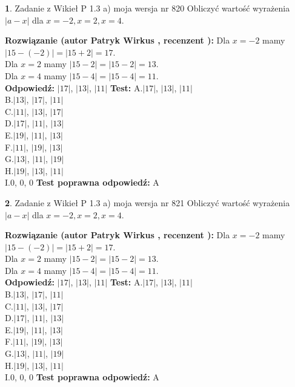 \documentclass[12pt, a4paper]{article}
\theoremstyle{definition} %
\newtheorem{zad}{}
\newcommand{\zadStart}[1]{\begin{zad}#1\newline}
\newcommand{\zadStop}{\end{zad}}
\newcommand{\rozwStart}[2]{\noindent \textbf{Rozwiązanie (autor #1 , recenzent #2): }\newline}
\newcommand{\rozwStop}{\newline}
\newcommand{\odpStart}{\noindent \textbf{Odpowiedź:}\newline}
\newcommand{\odpStop}{\newline}
\newcommand{\testStart}{\noindent \textbf{Test:}\newline}
\newcommand{\testStop}{\newline}
\newcommand{\kluczStart}{\noindent \textbf{Test poprawna odpowiedź:}\newline}
\newcommand{\kluczStop}{\newline}
\begin{document}
\zadStart{Zadanie z Wikieł P 1.3 a) moja wersja nr 820}
Obliczyć wartość wyrażenia $|a - x|$ dla $x=-2,x=2,x=4$.
\zadStop
\rozwStart{Patryk Wirkus}{}
Dla $x = -2$ mamy $|15 - (-2)| = |15 + 2| = 17$.\\
Dla $x = 2$ mamy $|15 - 2| = |15 - 2| = 13$.\\
Dla $x = 4$ mamy $|15 - 4| = |15 - 4| = 11$.\\
\rozwStop
\odpStart
$|17|$, $|13|$, $|11|$
\odpStop
\testStart
A.$|17|$, $|13|$, $|11|$\\
B.$|13|$, $|17|$, $|11|$\\
C.$|11|$, $|13|$, $|17|$\\
D.$|17|$, $|11|$, $|13|$\\
E.$|19|$, $|11|$, $|13|$\\
F.$|11|$, $|19|$, $|13|$\\
G.$|13|$, $|11|$, $|19|$\\
H.$|19|$, $|13|$, $|11|$\\
I.$0$, $0$, $0$
\testStop
\kluczStart
A
\kluczStop



\zadStart{Zadanie z Wikieł P 1.3 a) moja wersja nr 821}
Obliczyć wartość wyrażenia $|a - x|$ dla $x=-2,x=2,x=4$.
\zadStop
\rozwStart{Patryk Wirkus}{}
Dla $x = -2$ mamy $|15 - (-2)| = |15 + 2| = 17$.\\
Dla $x = 2$ mamy $|15 - 2| = |15 - 2| = 13$.\\
Dla $x = 4$ mamy $|15 - 4| = |15 - 4| = 11$.\\
\rozwStop
\odpStart
$|17|$, $|13|$, $|11|$
\odpStop
\testStart
A.$|17|$, $|13|$, $|11|$\\
B.$|13|$, $|17|$, $|11|$\\
C.$|11|$, $|13|$, $|17|$\\
D.$|17|$, $|11|$, $|13|$\\
E.$|19|$, $|11|$, $|13|$\\
F.$|11|$, $|19|$, $|13|$\\
G.$|13|$, $|11|$, $|19|$\\
H.$|19|$, $|13|$, $|11|$\\
I.$0$, $0$, $0$
\testStop
\kluczStart
A
\kluczStop
\end{document}

